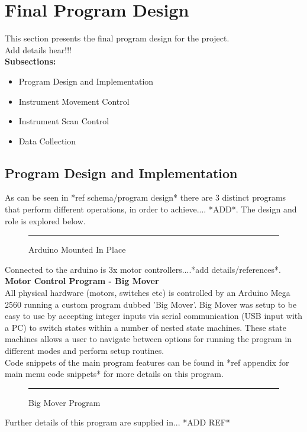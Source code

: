 \documentclass{UoNMCHA}
\numberwithin{equation}{section}
\begin{document}
\section{Final Program Design}\label{sec:Final Program Design}
This section presents the final program design for the project.\\
Add details hear!!!\\
\textbf{Subsections:}
\begin{itemize}
	\item Program Design and Implementation
	\item Instrument Movement Control
	\item Instrument Scan Control
	\item Data Collection
\end{itemize}

\subsection{Program Design and Implementation}\label{sub:Program Design and Implementation}
As can be seen in *ref schema/program design* there are 3 distinct programs that perform different operations, in order to achieve.... *ADD*. The design and role is explored below. \\
\begin{figure}[h]
	\centering
	\rule{0.5\textwidth}{0.5\textwidth}%
	\caption{Arduino Mounted In Place}
	\label{fig:Arduino Mounted In Place}
\end{figure}
Connected to the arduino is 3x motor controllers....*add details/references*. \\
\textbf{Motor Control Program - Big Mover}\\
All physical hardware (motors, switches etc) is controlled by an Arduino Mega 2560 running a custom program dubbed 'Big Mover'. Big Mover was setup to be easy to use by accepting integer inputs via serial communication (USB input with a PC) to switch states within a number of nested state machines. These state machines allows a user to navigate between options for running the program in different modes and perform setup routines.\\

Code snippets of the main program features can be found in *ref appendix for main menu code snippets* for more details on this program. \\
\begin{figure}[h]
	\centering
	\rule{0.5\textwidth}{0.5\textwidth}%
	\caption{Big Mover Program}
	\label{fig:Big Mover Program}
\end{figure}
Further details of this program are supplied in... *ADD REF* \\
\end{document}
